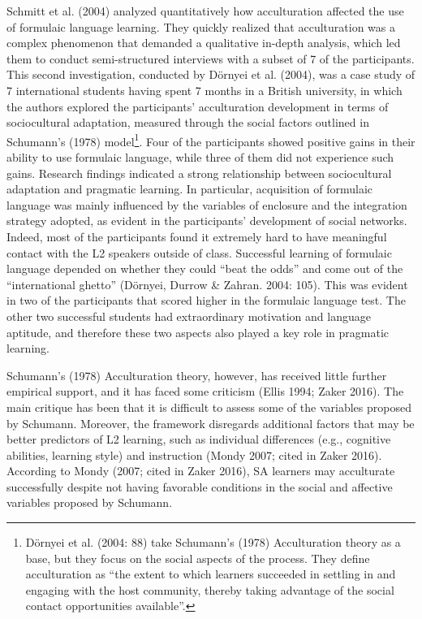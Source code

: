 \documentclass[12pt]{article}
\newenvironment{styleStandard}{\setlength\leftskip{0cm}\setlength\rightskip{0cm plus 1fil}\setlength\parindent{0cm}\setlength\parfillskip{0pt plus 1fil}\setlength\parskip{0in plus 1pt}\writerlistparindent\writerlistleftskip\leavevmode\normalfont\normalsize\writerlistlabel\ignorespaces}{\unskip\vspace{0.111in plus 0.0111in}\par}
\newcommand\writerlistleftskip{}
\newcommand\writerlistparindent{}
\newcommand\writerlistlabel{}
\begin{document}
\begin{styleStandard}
Schmitt et al. (2004) analyzed quantitatively how acculturation affected the use of formulaic language learning. They quickly realized that acculturation was a complex phenomenon that demanded a qualitative in-depth analysis, which led them to conduct semi-structured interviews with a subset of 7 of the participants. This second investigation, conducted by Dörnyei et al. (2004), was a case study of 7 international students having spent 7 months in a British university, in which the authors explored the participants’ acculturation development in terms of sociocultural adaptation, measured through the social factors outlined in Schumann’s (1978) model\footnote{Dörnyei et al. (2004: 88) take Schumann’s (1978) Acculturation theory as a base, but they focus on the social aspects of the process. They define acculturation as “the extent to which learners succeeded in settling in and engaging with the host community, thereby taking advantage of the social contact opportunities available”. }. Four of the participants showed positive gains in their ability to use formulaic language, while three of them did not experience such gains. Research findings indicated a strong relationship between sociocultural adaptation and pragmatic learning. In particular, acquisition of formulaic language was mainly influenced by the variables of enclosure and the integration strategy adopted, as evident in the participants’ development of social networks. Indeed, most of the participants found it extremely hard to have meaningful contact with the L2 speakers outside of class. Successful learning of formulaic language depended on whether they could “beat the odds” and come out of the “international ghetto” (Dörnyei, Durrow \& Zahran. 2004: 105). This was evident in two of the participants that scored higher in the formulaic language test. The other two successful students had extraordinary motivation and language aptitude, and therefore these two aspects also played a key role in pragmatic learning. 
\end{styleStandard}

\begin{styleStandard}
Schumann’s (1978) Acculturation theory, however, has received little further empirical support, and it has faced some criticism (Ellis 1994; Zaker 2016). The main critique has been that it is difficult to assess some of the variables proposed by Schumann. Moreover, the framework disregards additional factors that may be better predictors of L2 learning, such as individual differences (e.g., cognitive abilities, learning style) and instruction (Mondy 2007; cited in Zaker 2016). According to Mondy (2007; cited in Zaker 2016), SA learners may acculturate successfully despite not having favorable conditions in the social and affective variables proposed by Schumann. 
\end{styleStandard}
\end{document}
